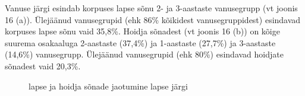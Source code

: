 \documentclass[12pt]{article}
\begin{document}
Vanuse järgi esindab korpuses lapse sõnu 2- ja 3-aastaste vanusegrupp (vt joonis 16 (a)). Ülejäänud vanusegrupid (ehk 86\% kõikidest vanusegruppidest) esindavad korpuses lapse sõnu vaid 35,8\%. Hoidja sõnadest (vt joonis 16 (b)) on kõige suurema osakaaluga 2-aastaste (37,4\%) ja 1-aastaste (27,7\%) ja 3-aastaste (14,6\%) vanusegrupp. Ülejäänud vanusegrupid (ehk 80\%) esindavad hoidjate sõnadest vaid 20,3\%.

\begin{figure}[H]
    \centering
    \qquad
    \caption{lapse ja hoidja sõnade jaotumine lapse järgi}
\end{figure}
\end{document}
